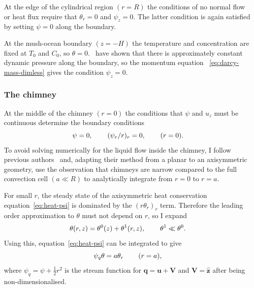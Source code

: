 \documentclass[11pt,twocolumn]{article}
\makeatletter
\newcommand{\specialeqref}[2]{\begingroup
  \def\tagform@##1{\maketag@@@{(\ignorespaces##1\unskip\@@italiccorr#2)}}%
  \eqref{#1}\endgroup}
\makeatother
\begin{document}
At the edge of the cylindrical region $(r=R)$ the conditions of no normal flow or heat flux require that $\theta_r=0$ and $\psi_z=0$. The latter condition is again satisfied by setting $\psi = 0$ along the boundary.

At the mush-ocean boundary $(z=-H)$ the temperature and concentration are fixed at $T_0$ and $C_0$, so $\theta=0$.~\citet*{emms-fowler-94} have shown that there is approximately constant dynamic pressure along the boundary, so the momentum equation~\specialeqref{eq:darcy-mass-dimless}{a} gives the condition $\psi_z = 0$. 

\subsubsection{The chimney}
At the middle of the chimney $(r=0)$ the conditions that $\psi$ and $u_z$ must be continuous determine the boundary conditions 
\begin{equation}
\label{eq:axi-chimney-bcs}
\psi = 0, \hspace{5ex} (\psi_r/r)_r = 0,   \hspace{5ex} (r=0).
\end{equation}
To avoid solving numerically for the liquid flow inside the chimney, I follow previous authors~\citep*{schulze-worster-98,chung-worster-02,wells-et-al-10} and, adapting their method from a planar to an axisymmetric geometry, use the observation that chimneys are narrow compared to the full convection cell $(a\ll R)$ to analytically integrate from $r=0$ to $r=a$. 

For small $r$, the steady state of the axisymmetric heat conservation equation~\eqref{eq:heat-psi} is dominated by the $(r \theta_r)_r$ term. Therefore the leading order approximation to $\theta$ must not depend on $r$, so I expand
\begin{equation}
\label{eq:theta-approx}
\theta(r,z) = \theta^0(z) + \theta^1(r,z), \hspace{5ex} \theta^1 \ll \theta^0.
\end{equation}
Using this, equation~\eqref{eq:heat-psi} can be integrated to give
\begin{equation}
\label{eq:theta-a-bc}
\psi_q \theta = a \theta_r   \hspace{5ex} (r=a),
\end{equation}
where $\psi_q = \psi + \frac{1}{2} r^2$ is the stream function for $\mathbf{q} = \mathbf{u} + \mathbf{V}$ and $\mathbf{V} =  \mathbf{\hat{z}}$ after being non-dimensionalised.
\end{document}
